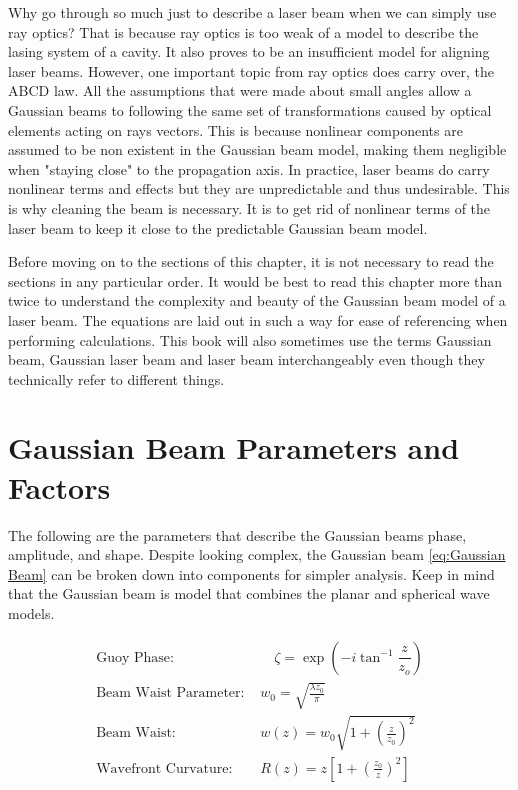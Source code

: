 \documentclass[11pt,a4paper]{book}
\begin{document}
	Why go through so much just to describe a laser beam when we can simply use ray optics? That is because ray optics is too weak of a model to describe the lasing system of a cavity. It also proves to be an insufficient model for aligning laser beams. However, one important topic from ray optics does carry over, the ABCD law. All the assumptions that were made about small angles allow a Gaussian beams to following the same set of transformations caused by optical elements acting on rays vectors. This is because nonlinear components are assumed to be non existent in the Gaussian beam model, making them negligible when "staying close" to the propagation axis. In practice, laser beams do carry nonlinear terms and effects but they are unpredictable and thus undesirable. This is why cleaning the beam is necessary. It is to get rid of nonlinear terms of the laser beam to keep it close to the predictable Gaussian beam model. 
	
	Before moving on to the sections of this chapter, it is not necessary to read the sections in any particular order. It would be best to read this chapter more than twice to understand the complexity and beauty of the Gaussian beam model of a laser beam. The equations are laid out in such a way for ease of referencing when performing calculations. This book will also sometimes use the terms Gaussian beam, Gaussian laser beam and laser beam interchangeably even though they technically refer to different things. 
	\section{Gaussian Beam Parameters and Factors}
		\label{sec:Gaussian Beam Parameters and Factors}
		The following are the parameters that describe the Gaussian beams phase, amplitude, and shape. Despite looking complex, the Gaussian beam \autoref{eq:Gaussian Beam} can be broken down into components for simpler analysis. Keep in mind that the Gaussian beam is model that combines the planar and spherical wave models.
		
		\begin{equation}
			\label{eq:Gaussian Beam Parameters}
			\begin{split}
			\text{Guoy Phase: }& \quad \zeta = \exp\left(-i\tan^{-1}{\dfrac{z}{z_o}}\right) \\
			\text{Beam Waist Parameter: }& w_0 = \sqrt{\frac{\lambda z_0}{\pi}}\\
			\text{Beam Waist: } & w(z) = w_0 \sqrt{1+\left(\frac{z}{z_0}\right)^2}\\
			\text{Wavefront Curvature: } & R(z)=z\left[1+\left(\frac{z_0}{z}\right)^2 \right]
			\end{split}
		\end{equation}
		
\end{document}
